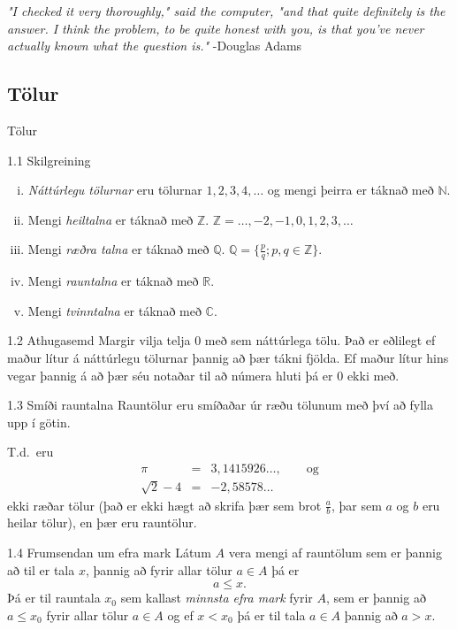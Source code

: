 \documentclass[icelandic,a4paper,12pt]{article}
\newcommand{\C}{{\mathbb  C}}
\newcommand{\Z}{{\mathbb Z}}
\newcommand{\R}{{\mathbb  R}}
\newcommand{\N}{{\mathbb  N}}
\newcommand{\Q}{{\mathbb Q}}
\begin{document}
\emph{"I checked it very thoroughly," said the computer, "and that 
quite definitely is the answer. I think the problem, to be quite 
honest with you, is that you've never actually known what the 
question is."} \hfill -Douglas Adams
 



\subsection*{Tölur}

\begin{frame}{Tölur}
\begin{block}{1.1 Skilgreining}
\begin{enumerate}[(i)]
\item  \emph{Náttúrlegu tölurnar} eru tölurnar
$1, 2, 3, 4, \ldots$ og mengi þeirra er táknað með $\N$.   \pause
\item Mengi \emph{heiltalna} er táknað með $\Z$. $\Z = \ldots,-2,-1,0,1,2,3,\ldots$\pause
\item Mengi \emph{ræðra talna} er táknað með $\Q$. $\Q = \{ \frac pq ; p,q \in \Z \}$.\pause
\item Mengi \emph{rauntalna} er táknað með $\R$.\pause
\item Mengi \emph{tvinntalna} er táknað með $\C$.
\end{enumerate}
\end{block}

\pause

\begin{block}{1.2 Athugasemd}  
Margir vilja telja $0$ með sem náttúrlega tölu.  Það er eðlilegt ef 
maður lítur á náttúrlegu tölurnar þannig að þær tákni fjölda.  Ef maður lítur hins vegar þannig
á að þær séu notaðar til að númera hluti
þá er 0 ekki með.
\end{block}

\end{frame}


\begin{frame}
\begin{block}{1.3 Smíði rauntalna}  Rauntölur eru smíðaðar úr ræðu tölunum
með því að fylla upp í götin. 

\pause

T.d.~eru 
\begin{eqnarray*}
\pi &=& 3,1415926\ldots, \qquad \text{og}\\
\sqrt 2 -4  &=& -2,58578\ldots
\end{eqnarray*}
ekki ræðar tölur (það er ekki hægt að skrifa þær sem brot $\frac ab$, 
þar sem $a$ og $b$ eru heilar tölur), en þær eru rauntölur.
\end{block}

\pause


\begin{block}{1.4 Frumsendan um efra mark}  
Látum $A$ vera mengi af  rauntölum
sem er þannig að til er tala $x$, þannig að 
fyrir allar tölur $a \in A$ þá er 
$$a\leq x.$$ 
Þá er til rauntala $x_0$ sem kallast {\em minnsta efra mark} fyrir
$A$, sem er þannig að  $a\leq x_0$ fyrir allar tölur $a\in
A$ og ef $x<x_0$ þá er til tala $a\in A$ þannig að $a>x$.  
\end{block}
\end{frame}
\end{document}

